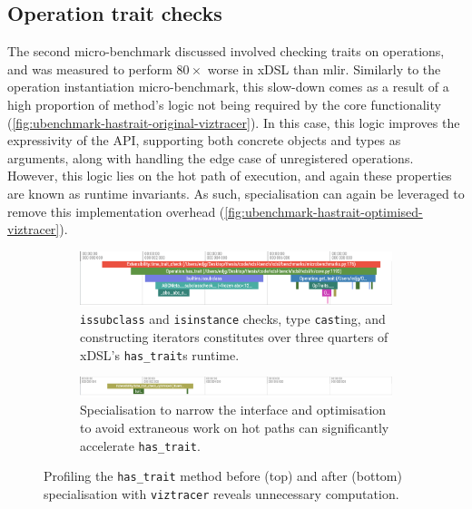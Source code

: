 \subsection{Operation trait checks}
\label{ssec:specialising-ubenchmarks-trait}

The second micro-benchmark discussed involved checking traits on operations, and was measured to perform $80\times$ worse in xDSL than \ac{mlir}.
Similarly to the operation instantiation micro-benchmark, this slow-down comes as a result of a high proportion of method's logic not being required by the core functionality (\autoref{fig:ubenchmark-hastrait-original-viztracer}). In this case, this logic improves the expressivity of the API, supporting both concrete objects and types as arguments, along with handling the edge case of unregistered operations. However, this logic lies on the hot path of execution, and again these properties are known as runtime invariants. As such, specialisation can again be leveraged to remove this implementation overhead (\autoref{fig:ubenchmark-hastrait-optimised-viztracer}).

\begin{figure}[H]
    \centering
    \begin{subfigure}[b]{\textwidth}
        \centering
        \includegraphics[width=\textwidth]{images/specialising_optimising_xdsl_rewriting/original_hastrait_scale.png}
        \captionsetup{width=0.8\textwidth}
        \caption{\texttt{issubclass} and \texttt{isinstance} checks, type \texttt{cast}ing, and constructing iterators constitutes over three quarters of xDSL's \texttt{has_trait}s runtime.}
        \label{fig:ubenchmark-hastrait-original-viztracer}
    \end{subfigure}
    \begin{subfigure}[b]{\textwidth}
        \centering
        \includegraphics[width=\textwidth]{images/specialising_optimising_xdsl_rewriting/optimised_hastrait_scale.png}
        \captionsetup{width=0.8\textwidth}
        \caption{Specialisation to narrow the interface and optimisation to avoid extraneous work on hot paths can significantly accelerate \texttt{has_trait}.}
        \label{fig:ubenchmark-hastrait-optimised-viztracer}
    \end{subfigure}
    \caption{Profiling the \texttt{has\_trait} method before (top) and after (bottom) specialisation with \texttt{viztracer} reveals unnecessary computation.}
    \label{fig:ubenchmark-hastrait-viztracer}
\end{figure}

